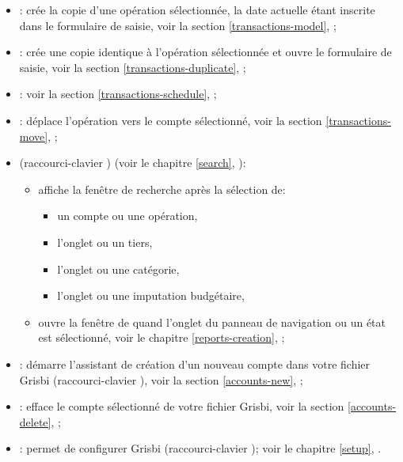 \begin{itemize}	
\item {}: crée la copie d'une opération sélectionnée, la date actuelle étant inscrite dans le formulaire de saisie, voir la section \vref{transactions-model}, ;
\item {}: crée une copie identique à l'opération sélectionnée et ouvre le formulaire de saisie, voir la section \vref{transactions-duplicate}, ;
\item {}: voir la section \vref{transactions-schedule}, ;
\item {}: déplace l'opération vers le compte sélectionné, voir la section \vref{transactions-move}, ;
\item {} (raccourci-clavier ) (voir le chapitre \vref{search}, ):
	\begin{itemize}
		\item affiche la fenêtre de recherche après la sélection de:
			\begin{itemize}
				\item un compte ou une opération,
				\item l'onglet  ou un tiers,
				\item l'onglet  ou une catégorie,
				\item l'onglet  ou une imputation budgétaire,
 			\end{itemize}
 		\item ouvre la fenêtre de  quand l'onglet  du panneau de navigation ou un état est sélectionné, voir le chapitre \vref{reports-creation}, ;
	\end{itemize}
\item {}: démarre l'assistant de création d'un nouveau compte dans votre fichier Grisbi (raccourci-clavier ), voir la section \vref{accounts-new}, ;
\item {}: efface le compte sélectionné de votre fichier Grisbi, voir la section \vref{accounts-delete}, ;
\item {}: permet de configurer Grisbi (raccourci-clavier ); voir le chapitre \vref{setup}, .
\end{itemize}


